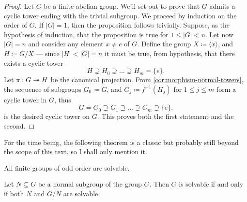 \begin{proof}
Let \(G\) be a finite abelian group. We'll set out to prove that \(G\) admits a
cyclic tower ending with the trivial subgroup. We proceed by induction on the
order of \(G\). If \(|G| = 1\), then the proposition follows trivially. Suppose,
as the hypothesis of induction, that the proposition is true for \(1 \leq |G| <
n\). Let now \(|G| = n\) and consider any element \(x \neq e\) of \(G\). Define
the group \(X \coloneq \langle x \rangle\), and \(H \coloneq G/X\) --- since
\(|H| < |G| = n\) it must be true, from hypothesis, that there exists a cyclic
tower
\[
  H \supsetneq H_0 \supsetneq \dots \supsetneq H_m = \{e\}.
\]
Let \(\pi: G \twoheadrightarrow H\) be the canonical projection. From
\cref{cor:morphism-normal-towers}, the sequence of subgroups \(G_0 \coloneq G\),
and \(G_j \coloneq f^{-1}(H_j)\) for \(1 \leq j \leq m\) form a cyclic tower in
\(G\), thus
\[
  G = G_0 \supsetneq G_1 \supsetneq \dots \supsetneq G_m \supsetneq \{e\}.
\]
is the desired cyclic tower on \(G\). This proves both the first statement and
the second.
\end{proof}

For the time being, the following theorem is a classic but probably still beyond
the scope of this text, so I shall only mention it.

\begin{theorem}
\label{thm:feit-thompson}
All finite groups of odd order are solvable.
\end{theorem}

\begin{theorem}
\label{thm:solvable-iff-normal-and-quotient-solvable}
Let \(N \subseteq G\) be a normal subgroup of the group \(G\). Then \(G\) is
solvable if and only if both \(N\) and \(G/N\) are solvable.
\end{theorem}

